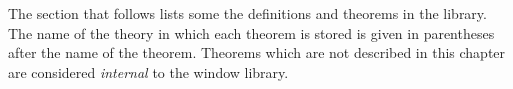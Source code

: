 The section that follows lists some the definitions and theorems in the
 library.
The name of the theory in which each theorem is stored is
given in parentheses after the name of the theorem.
Theorems which are not described in this chapter are considered {\it internal\/}
to the window library.
